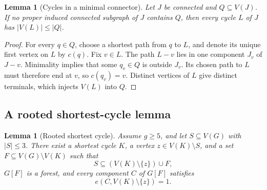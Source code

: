 \documentclass[11pt]{article}
\numberwithin{equation}{section}
\newtheorem{lemma}[theorem]{Lemma}
\theoremstyle{remark}
\begin{document}
\begin{lemma}[Cycles in a minimal connector]\label{w142-lem:minimal-connector}
Let $J$ be connected and $Q\subseteq V(J)$.  If no proper induced connected
subgraph of $J$ contains $Q$, then every cycle $L$ of $J$ has
$|V(L)|\le |Q|$.
\end{lemma}

\begin{proof}
For every $q\in Q$, choose a shortest path from $q$ to $L$, and denote its
unique first vertex on $L$ by $c(q)$.  Fix $v\in L$.  The path $L-v$ lies
in one component $J_v$ of $J-v$.  Minimality implies that some
$q_v\in Q$ is outside $J_v$.  Its chosen path to $L$ must therefore end at
$v$, so $c(q_v)=v$.  Distinct vertices of $L$ give distinct terminals,
which injects $V(L)$ into $Q$.
\end{proof}

\subsection{A rooted shortest-cycle lemma}

\begin{lemma}[Rooted shortest cycle]\label{w142-lem:rooted-cycle}
Assume $g\ge5$, and let $S\subseteq V(G)$ with $|S|\le3$.  There exist a
shortest cycle $K$, a vertex $z\in V(K)\setminus S$, and a set
$F\subseteq V(G)\setminus V(K)$ such that
\[
 S\subseteq (V(K)\setminus\{z\})\cup F,
\]
$G[F]$ is a forest, and every component $C$ of $G[F]$ satisfies
\[
 e(C,V(K)\setminus\{z\})=1.
\]
\end{lemma}
\end{document}
